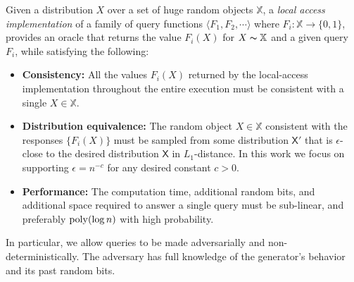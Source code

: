 \begin{definition}
\label{def:local_access}
Given a distribution $X$ over a set of huge random objects $\mathbb X$, a \emph{local access implementation}
of a family of query functions $\langle F_1, F_2,\cdots \rangle$ where $F_i: \mathbb X\rightarrow \{0,1\}$,
provides an oracle that returns the value $F_i(X)$ for $X\thicksim \mathbb X$ and a given query $F_i$, while satisfying the following:
\begin{itemize}
    \item \textbf{Consistency:}
    All the values $F_i(X)$ returned by the local-access implementation throughout the entire execution
    must be consistent with a single $X\in \mathbb X$.
    \item \textbf{Distribution equivalence:}
    The random object $X\in \mathbb X$ consistent with the responses $\{ F_i(X)\}$ must be sampled from some distribution $\mathsf{X}'$
    that is $\epsilon$-close to the desired distribution $\mathsf{X}$ in $L_1$-distance.
    In this work we focus on supporting $\epsilon = n^{-c}$ for any desired constant $c>0$.
    \item \textbf{Performance:}
    The computation time, additional random bits, and additional space required to answer a single query must be sub-linear,
    and preferably $\mathrm{poly}(\log n)$ with high probability.
\end{itemize}
\end{definition}
In particular, we allow queries to be made adversarially and non-deterministically. The adversary has full knowledge of the generator's behavior and its past random bits.





